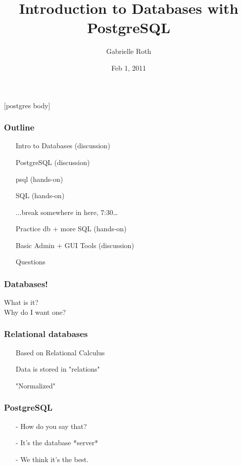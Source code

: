 \documentclass[20pt]{beamer}
\title{Introduction to Databases with PostgreSQL}
\author{Gabrielle Roth}
\institute{PDXPUG \& FreeGeek}
\date{Feb 1, 2011}
\begin{document}
\frame{
    \titlepage
}

[postgres body]

\frame
{
    \frametitle{Outline}
    \begin{itemize}
    \item[] Intro to Databases (discussion)
    \item[] PostgreSQL (discussion)
    \item[] psql (hands-on)
    \item[] SQL (hands-on)
    \item[] $\ldots$break somewhere in here, 7:30\ldots
    \item[] Practice db + more SQL (hands-on)
    \item[] Basic Admin + GUI Tools (discussion)
    \item[] Questions
    \end{itemize}
}


\frame
{
    \frametitle{Databases!}
    \begin{center}
    What is it?\\
    Why do I want one?
    \end{center}
}

\frame
{
    \frametitle{Relational databases}
    \begin{itemize}
    \item[] Based on Relational Calculus
    \item[] Data is stored in "relations"
    \item[] "Normalized"
    \end{itemize}
}

\frame
{
    \frametitle{PostgreSQL}
    \begin{itemize}
    \item[-] How do you say that?
    \item[-] It's the database *server*
    \item[-] We think it's the best.
    \end{itemize}
}
\end{document}
